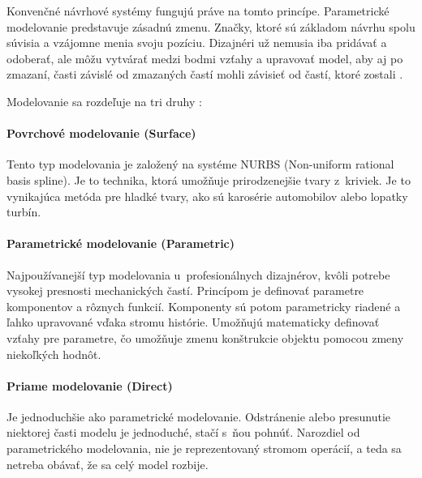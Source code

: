 Konvenčné návrhové systémy fungujú práve na tomto princípe. Parametrické modelovanie predstavuje zásadnú zmenu. Značky, ktoré sú základom návrhu spolu súvisia a vzájomne menia svoju pozíciu. Dizajnéri už nemusia iba pridávať a odoberať, ale môžu vytvárať medzi bodmi vzťahy a upravovať model, aby aj po zmazaní, časti závislé od zmazaných častí mohli závisieť od častí, ktoré zostali \cite{woodbury2010elements}. 








Modelovanie sa rozdeľuje na tri druhy \cite{recrosio_2017}:

\paragraph{Povrchové modelovanie (Surface)}
Tento typ modelovania je založený na systéme NURBS (Non-uniform rational basis spline). Je to technika, ktorá umožňuje prirodzenejšie tvary z~kriviek. Je to vynikajúca metóda pre  hladké tvary, ako sú karosérie automobilov alebo lopatky turbín.

\paragraph{Parametrické modelovanie (Parametric)}
Najpoužívanejší typ modelovania u~profesionálnych dizajnérov, kvôli potrebe vysokej presnosti mechanických častí. Princípom je definovať parametre komponentov a rôznych funkcií. Komponenty sú potom parametricky riadené a ľahko upravované vďaka  stromu histórie. Umožňujú matematicky definovať vzťahy pre parametre, čo umožňuje zmenu konštrukcie objektu pomocou zmeny niekoľkých hodnôt.

\paragraph{Priame modelovanie (Direct)}
Je jednoduchšie ako parametrické modelovanie. Odstránenie alebo presunutie niektorej časti modelu je jednoduché, stačí s~ňou pohnúť. Narozdiel od parametrického modelovania, nie je reprezentovaný stromom operácií, a teda sa netreba obávať, že sa celý model rozbije. 



